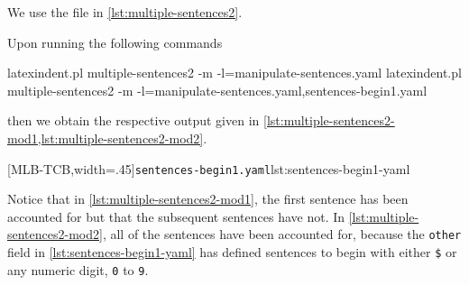  \begin{example}
 We use the file in \cref{lst:multiple-sentences2}.


 Upon running the following commands  
 \begin{widepage}

  \begin{commandshell}
latexindent.pl multiple-sentences2 -m -l=manipulate-sentences.yaml
latexindent.pl multiple-sentences2 -m -l=manipulate-sentences.yaml,sentences-begin1.yaml
\end{commandshell}

 \end{widepage}
 then we obtain the respective output given in
 \cref{lst:multiple-sentences2-mod1,lst:multiple-sentences2-mod2}.

 \begin{cmhtcbraster}[
   raster force size=false,
   raster column 1/.style={add to width=1cm},
  ]
  [MLB-TCB,width=.45\textwidth]{\texttt{sentences-begin1.yaml}}{lst:sentences-begin1-yaml}
 \end{cmhtcbraster}
 Notice that in \cref{lst:multiple-sentences2-mod1}, the first sentence has been
 accounted for but that the subsequent sentences have not. In
 \cref{lst:multiple-sentences2-mod2}, all of the sentences have been accounted for,
 because the \texttt{other} field in \cref{lst:sentences-begin1-yaml} has defined
 sentences to begin with either \lstinline!$! or any numeric digit, \texttt{0} to
 \texttt{9}.
 \end{example}


